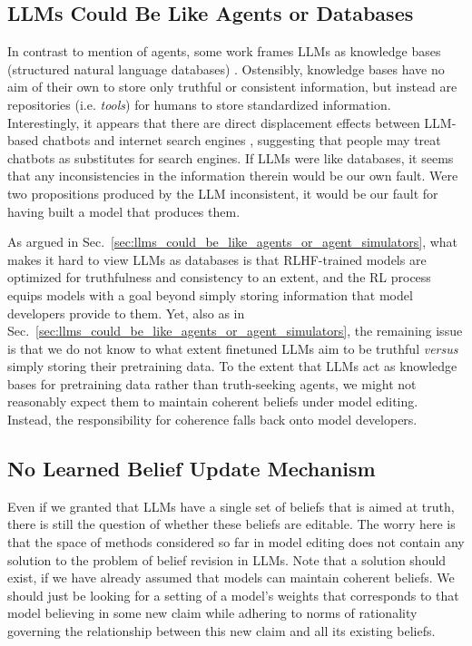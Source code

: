 \documentclass[11pt,a4paper]{article}
\begin{document}
\subsection{LLMs Could Be Like Agents or Databases}
\label{sec:llms_could_be_like_agents_or_databases}

In contrast to mention of agents, some work frames LLMs as knowledge bases (structured natural language databases) \citep{petroni-etal-2019-language, roberts-etal-2020-much, alkhamissi2022review, dhingra2022time}. Ostensibly, knowledge bases have no aim of their own to store only truthful or consistent information, but instead are repositories (i.e. \emph{tools}) for humans to store standardized information. Interestingly, it appears that there are direct displacement effects between LLM-based chatbots and internet search engines \citep{gude2023factors}, suggesting that people may treat chatbots as substitutes for search engines. If LLMs were like databases, it seems that any inconsistencies in the information therein would be our own fault. Were two propositions produced by the LLM inconsistent, it would be our fault for having built a model that produces them. 

As argued in Sec.~\ref{sec:llms_could_be_like_agents_or_agent_simulators}, what makes it hard to view LLMs as databases is that RLHF-trained models are optimized for truthfulness and consistency to an extent, and the RL process equips models with a goal beyond simply storing information that model developers provide to them. Yet, also as in Sec.~\ref{sec:llms_could_be_like_agents_or_agent_simulators}, the remaining issue is that we do not know to what extent finetuned LLMs aim to be truthful \emph{versus} simply storing their pretraining data. To the extent that LLMs act as knowledge bases for pretraining data rather than truth-seeking agents, we might not reasonably expect them to maintain coherent beliefs under model editing. Instead, the responsibility for coherence falls back onto model developers.

\subsection{No Learned Belief Update Mechanism}
\label{sec:no_natural_belief_update_mechanism}

Even if we granted that LLMs have a single set of beliefs that is aimed at truth, there is still the question of whether these beliefs are editable. 
The worry here is that the space of methods considered so far in model editing does not contain any solution to the problem of belief revision in LLMs.
Note that a solution should exist, if we have already assumed that models can maintain coherent beliefs.
We should just be looking for a setting of a model's weights that corresponds to that model believing in some new claim while adhering to norms of rationality governing the relationship between this new claim and all its existing beliefs. 
\end{document}
